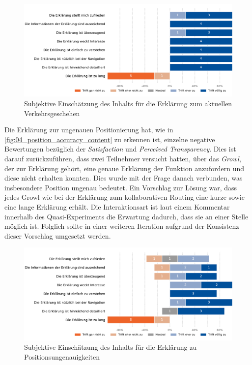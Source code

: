 \begin{figure}[htb!]
    \centering
    \includegraphics[width=\textwidth]{contents/06_model_evaluation/02_evaluation/res/qualitativeFeedback-03_traffic_volume_content.pdf}
    \caption{Subjektive Einschätzung des Inhalts für die Erklärung zum aktuellen Verkehrsgeschehen}
    \label{fig:03_traffic_volume_content}
\end{figure}

\bigskip

Die Erklärung zur ungenauen Positionierung hat, wie in \autoref{fig:04_position_accuracy_content} zu erkennen ist, einzelne negative Bewertungen bezüglich der \textit{Satisfaction} und \textit{Perceived Transparency}. Dies ist darauf zurückzuführen, dass zwei Teilnehmer versucht hatten, über das \textit{Growl}, der zur Erklärung gehört, eine genaue Erklärung der Funktion anzufordern und diese nicht erhalten konnten. Dies wurde mit der Frage danach verbunden, was insbesondere \glqq Position ungenau\grqq{} bedeutet. Ein Vorschlag zur Lösung war, dass jedes \glqq Growl\grqq{} wie bei der Erklärung zum kollaborativen Routing eine kurze sowie eine lange Erklärung erhält. Die Interaktionsart ist laut einem Kommentar innerhalb des Quasi-Experiments die Erwartung dadurch, dass sie an einer Stelle möglich ist. Folglich sollte in einer weiteren Iteration aufgrund der Konsistenz dieser Vorschlag umgesetzt werden.

\begin{figure}[b!]
    \centering
    \includegraphics[width=\textwidth]{contents/06_model_evaluation/02_evaluation/res/qualitativeFeedback-04_position_accuracy_content.pdf}
    \caption{Subjektive Einschätzung des Inhalts für die Erklärung zu Positionsungenauigkeiten}
    \label{fig:04_position_accuracy_content}
\end{figure}

